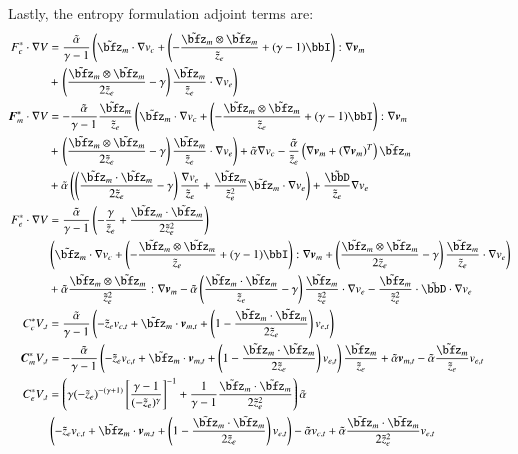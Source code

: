 \documentclass[preprint,12pt]{elsarticle}
\begin{document}
Lastly, the entropy formulation adjoint terms are:
\begin{align*}
F^*_c\cdot\Grad V&=\frac{\tilde\alpha}{\gamma-1}\left(
\tilde\bfz_m\cdot\Grad v_c
+\LRp{-\frac{\tilde\bfz_m\otimes\tilde\bfz_m}{\tilde z_e}+(\gamma-1)\bbI}:\Grad\bfv_m\right.\\
&+\left.
\LRp{\frac{\tilde\bfz_m\otimes\tilde\bfz_m}{2\tilde z_e}-\gamma}\frac{\tilde\bfz_m}{\tilde z_e}\cdot\Grad v_e
\right)
\\
\bfF^*_m\cdot\Grad V&=-\frac{\tilde\alpha}{\gamma-1}\frac{\tilde\bfz_m}{\tilde z_e}\left(
\tilde\bfz_m\cdot\Grad v_c
+\LRp{-\frac{\tilde\bfz_m\otimes\tilde\bfz_m}{\tilde z_e}+(\gamma-1)\bbI}:\Grad\bfv_m
\right.\\
&+\left.
\LRp{\frac{\tilde\bfz_m\otimes\tilde\bfz_m}{2\tilde z_e}-\gamma}\frac{\tilde\bfz_m}{\tilde z_e}\cdot\Grad v_e
\right)
+\tilde\alpha\Grad v_c
-\frac{\tilde\alpha}{\tilde z_e}\LRp{\Grad\bfv_m+(\Grad\bfv_m)^T}\tilde\bfz_m\\
&+\tilde\alpha\LRp{\LRp{\frac{\tilde\bfz_m\cdot\tilde\bfz_m}{2\tilde z_e}-\gamma}\frac{\Grad v_e}{\tilde z_e}
+\frac{\tilde\bfz_m}{\tilde z_e^2}\tilde\bfz_m\cdot\Grad v_e}
+\frac{\tilde\bbD}{\tilde z_e}\Grad v_e
\\
F^*_e\cdot\Grad V&=
\frac{\tilde\alpha}{\gamma-1}\LRp{-\frac{\gamma}{\tilde z_e}
+\frac{\tilde\bfz_m\cdot\tilde\bfz_m}{2\tilde z_e^2}}\\
&\LRp{
\tilde\bfz_m\cdot\Grad v_c
+\LRp{-\frac{\tilde\bfz_m\otimes\tilde\bfz_m}{\tilde z_e}+(\gamma-1)\bbI}:\Grad\bfv_m
+
\LRp{\frac{\tilde\bfz_m\otimes\tilde\bfz_m}{2\tilde z_e}-\gamma}\frac{\tilde\bfz_m}{\tilde z_e}\cdot\Grad v_e
}\\
&+\tilde\alpha\frac{\tilde\bfz_m\otimes\tilde\bfz_m}{\tilde z_e^2}:\Grad\bfv_m
-\tilde\alpha\LRp{\frac{\tilde\bfz_m\cdot\tilde\bfz_m}{\tilde z_e}-\gamma}\frac{\tilde\bfz_m}{\tilde z_e^2}\cdot\Grad v_e
-\frac{\tilde\bfz_m}{\tilde z_e^2}\cdot\tilde\bbD\cdot\Grad v_e
\\
%
C^*_cV_{,t}&=
\frac{\tilde\alpha}{\gamma-1}\LRp{-\tilde z_e v_{c,t}+\tilde\bfz_m\cdot\bfv_{m,t}
+\LRp{1-\frac{\tilde\bfz_m\cdot\tilde\bfz_m}{2\tilde z_e}}v_{e,t}}
\\
\bfC^*_mV_{,t}&=
-\frac{\tilde\alpha}{\gamma-1}\LRp{-\tilde z_e v_{c,t}+\tilde\bfz_m\cdot\bfv_{m,t}
+\LRp{1-\frac{\tilde\bfz_m\cdot\tilde\bfz_m}{2\tilde z_e}}v_{e,t}}\frac{\tilde\bfz_m}{\tilde z_e}
+\tilde\alpha\bfv_{m,t}-\tilde\alpha\frac{\tilde\bfz_m}{\tilde z_e}v_{e,t}
\\
C^*_eV_{,t}&=
\LRp{\gamma(-\tilde z_e)^{-(\gamma+1)}\LRs{\frac{\gamma-1}{(-\tilde z_e)^\gamma}}^{-1}
+\frac{1}{\gamma-1}\frac{\tilde\bfz_m\cdot\tilde\bfz_m}{2\tilde z_e^2}}\tilde\alpha\\
&\LRp{-\tilde z_e v_{c,t}+\tilde\bfz_m\cdot\bfv_{m,t}
+\LRp{1-\frac{\tilde\bfz_m\cdot\tilde\bfz_m}{2\tilde z_e}}v_{e,t}}
-\tilde\alpha v_{c,t}
+\tilde\alpha\frac{\tilde\bfz_m\cdot\tilde\bfz_m}{2\tilde z_e^2} v_{e,t}
\\
\end{align*}
\end{document}
